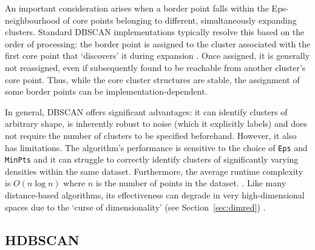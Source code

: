 \documentclass[10pt,oneside]{report}
\begin{document}
An important consideration arises when a border point falls within the Eps-neighbourhood of core points belonging to different, simultaneously expanding clusters. Standard DBSCAN implementations typically resolve this based on the order of processing: the border point is assigned to the cluster associated with the first core point that `discovers' it during expansion \cite{ester1996density}. Once assigned, it is generally not reassigned, even if subsequently found to be reachable from another cluster's core point. Thus, while the core cluster structures are stable, the assignment of some border points can be implementation-dependent.

In general, DBSCAN offers significant advantages: it can identify clusters of arbitrary shape, is inherently robust to noise (which it explicitly labels) and does not require the number of clusters to be specified beforehand. However, it also has limitations. The algorithm's performance is sensitive to the choice of \texttt{Eps} and \texttt{MinPts} and it can struggle to correctly identify clusters of significantly varying densities within the same dataset. Furthermore, the average runtime complexity is $O(n\log n)$ where $n$ is the number of points in the dataset. \cite{ester1996density, campello2013density}. Like many distance-based algorithms, its effectiveness can degrade in very high-dimensional spaces due to the `curse of dimensionality' (see Section~\ref{sec:dimred}) \cite{hinneburg1999optimal, verleysen2005curse}.



\subsection{HDBSCAN}
\end{document}
